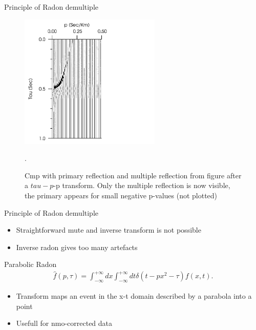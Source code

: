 \documentclass[xcolor=dvipsnames,notes]{beamer}
\begin{document}
\begin{frame}{Principle of Radon demultiple}
\begin{figure}
\includegraphics[width=0.6\textwidth]{Fig/fig-6-taup-nmo.pdf}
\caption{Cmp with primary reflection and multiple reflection  from figure \protect{\ref{fig-6-nmo}}
         after a $tau-p$-p transform. Only the multiple reflection is now visible, the primary
         appears for small negative p-values (not plotted)}.
\end{figure}
\end{frame}
\begin{frame}{Principle of Radon demultiple}
\begin{itemize}
  \item Straightforward mute and inverse transform is not possible
  \item Inverse radon gives too many artefacts
\end{itemize}
\end{frame}
\begin{frame}{Parabolic Radon}
%
\begin{eqnarray}
  \hat{f}(p,\tau) = \int^{+\infty}_{-\infty} dx \int^{+\infty}_{-\infty} dt \delta(t-px^2-\tau)f(x,t).
                   \label{eq:6-radon-para}
\end{eqnarray}
%

\begin{itemize}
 \item Transform maps an event in the x-t domain described by a parabola into a point
 \item Usefull for nmo-corrected data
\end{itemize}
\end{frame}
\end{document}
